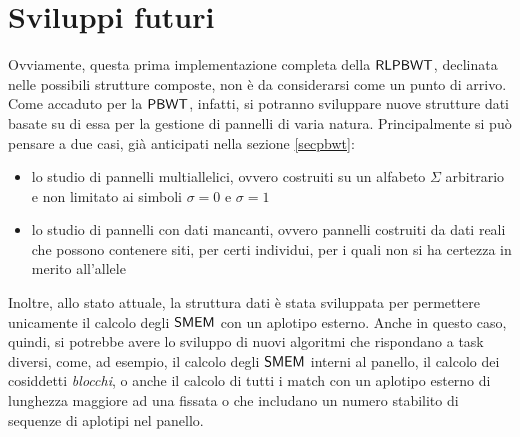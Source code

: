 \section{Sviluppi futuri}
Ovviamente, questa prima implementazione completa della $\mbox{\rm {\sf RLPBWT}}$,
declinata nelle possibili strutture composte, non è da
considerarsi come un punto di arrivo. Come accaduto per la $\mbox{\rm {\sf PBWT}}$,
infatti, si potranno sviluppare nuove strutture dati basate su di essa per la
gestione di pannelli di varia natura. Principalmente si può pensare a due casi,
già anticipati nella sezione \ref{secpbwt}:
\begin{itemize}
  \item lo studio di pannelli multiallelici, ovvero costruiti su un alfabeto
  $\Sigma$ arbitrario e non limitato ai simboli $\sigma=0$ e $\sigma=1$
  \item lo studio di pannelli con dati mancanti, ovvero pannelli costruiti
  da dati reali che possono contenere siti, per certi
  individui, per i quali non si ha certezza in merito all'allele
\end{itemize}
Inoltre, allo stato attuale, la struttura dati è stata sviluppata per permettere
unicamente il calcolo degli $\mbox{\rm {\sf SMEM}}$ con un aplotipo esterno. Anche in
questo caso, quindi, si potrebbe avere lo sviluppo di nuovi algoritmi che
rispondano a task diversi, come, ad esempio, il calcolo degli $\mbox{\rm {\sf SMEM}}$ interni al
panello, il 
calcolo dei cosiddetti \textit{blocchi}, o anche il calcolo di tutti i match con
un aplotipo 
esterno di lunghezza maggiore ad una fissata o che includano un numero stabilito
di sequenze di aplotipi nel panello.
